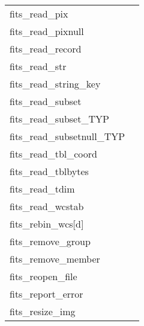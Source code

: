 \documentclass[11pt]{book}
\begin{document}
\begin{tabular}{lr}
fits\_read\_pix  & \pageref{ffgpxv} \\
fits\_read\_pixnull & \pageref{ffgpxf} \\
fits\_read\_record       & \pageref{ffgrec} \\
fits\_read\_str         & \pageref{ffgcrd} \\
fits\_read\_string\_key & \pageref{ffgsky} \\
fits\_read\_subset  & \pageref{ffgsv} \\
fits\_read\_subset\_TYP  & \pageref{ffgsvx} \pageref{ffgsvx2}\\
fits\_read\_subsetnull\_TYP & \pageref{ffgsfx} \pageref{ffgsfx2} \\
fits\_read\_tbl\_coord & \pageref{ffgtcs} \\
fits\_read\_tblbytes    & \pageref{ffgtbb} \\
fits\_read\_tdim         & \pageref{ffgtdm} \\
fits\_read\_wcstab       & \pageref{wcstab} \\
fits\_rebin\_wcs[d]  &  \pageref{rebinwcs} \\
fits\_remove\_group  & \pageref{ffgtrm} \\
fits\_remove\_member   & \pageref{ffgmrm} \\
fits\_reopen\_file      & \pageref{ffreopen} \\
fits\_report\_error   & \pageref{ffrprt} \\
fits\_resize\_img     & \pageref{ffrsim} \\
\end{tabular}
\end{document}
